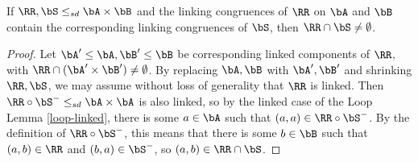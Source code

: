 \begin{lem} If $\RR, \bS \le_{sd} \bA \times \bB$ and the linking congruences of $\RR$ on $\bA$ and $\bB$ contain the corresponding linking congruences of $\bS$, then $\RR \cap \bS \ne \emptyset$.
\end{lem}
\begin{proof} Let $\bA' \le \bA, \bB' \le \bB$ be corresponding linked components of $\RR$, with $\RR \cap (\bA'\times\bB') \ne \emptyset$. By replacing $\bA,\bB$ with $\bA',\bB'$ and shrinking $\RR,\bS$, we may assume without loss of generality that $\RR$ is linked. Then $\RR \circ \bS^{-} \le_{sd} \bA \times \bA$ is also linked, so by the linked case of the Loop Lemma \ref{loop-linked}, there is some $a \in \bA$ such that $(a,a) \in \RR \circ \bS^-$. By the definition of $\RR \circ \bS^-$, this means that there is some $b \in \bB$ such that $(a,b) \in \RR$ and $(b,a) \in \bS^-$, so $(a,b) \in \RR\cap \bS$.
\end{proof}

